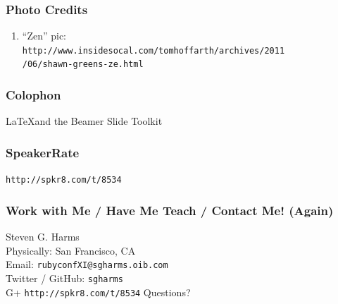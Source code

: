 \documentclass[slidestop,compress,mathserif]{beamer}
\begin{document}
\begin{frame}
	\frametitle{Photo Credits}
	\begin{enumerate}
		\footnotesize
		\item ``Zen'' pic:\\ \texttt{http://www.insidesocal.com/tomhoffarth/archives/2011\\
		 /06/shawn-greens-ze.html}
		\normalsize
	\end{enumerate}
\end{frame}

\begin{frame}
	\frametitle{Colophon}
	\LaTeX and the Beamer Slide Toolkit
\end{frame}

\begin{frame}
	\frametitle{SpeakerRate}
	\vskip 1.25cm
	\begin{center}
		\texttt{http://spkr8.com/t/8534}
	\end{center}
\end{frame}

\begin{frame}
	\frametitle{Work with Me / Have Me Teach / Contact Me! (Again)}
	\begin{center}
		Steven G. Harms \\
		\vskip 1.25cm
		Physically:  San Francisco, CA\\
		Email:  \texttt{rubyconfXI@sgharms.oib.com} \\
		Twitter / GitHub:  \texttt{sgharms} \\
		G+
		\vskip 1.0cm
				\texttt{http://spkr8.com/t/8534}
		\vskip 1.0cm
		Questions?
	\end{center}
\end{frame}
\end{document}
